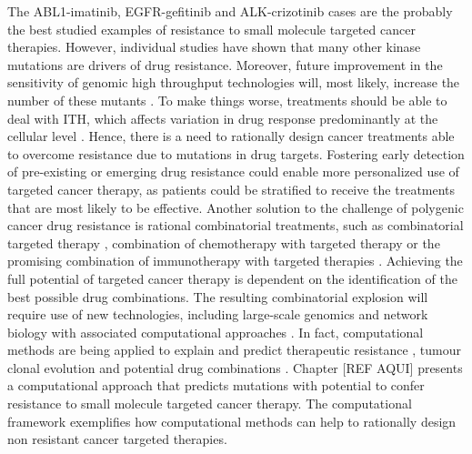 \documentclass[12pt, b5paper,twoside]{tesi_upf}
\begin{document}
\par The ABL1-imatinib, EGFR-gefitinib and ALK-crizotinib cases are the probably the best studied examples of resistance to small molecule targeted cancer therapies. However, individual studies have shown that many other kinase mutations are drivers of drug resistance. Moreover, future improvement in the sensitivity of genomic high throughput technologies will, most likely, increase the number of these mutants \cite{Schmitt2015}. To make things worse, treatments should be able to deal with ITH, which affects variation in drug response predominantly at the cellular level \cite{Burrell2014}. Hence, there is a need to rationally design cancer treatments able to overcome resistance due to mutations in drug targets. Fostering early detection of pre-existing or emerging drug resistance could enable more personalized use of targeted cancer therapy, as patients could be stratified to receive the treatments that are most likely to be effective. Another solution to the challenge of polygenic cancer drug resistance is rational combinatorial treatments, such as combinatorial targeted therapy \cite{Flaherty2012}, combination of chemotherapy with targeted therapy \cite{Cortes2016} or the promising combination of immunotherapy with targeted therapies \cite{Vanneman2012}. Achieving the full potential of targeted cancer therapy is dependent on the identification of the best possible drug combinations. The resulting combinatorial explosion will require use of new technologies, including large-scale genomics and network biology with associated computational approaches \cite{Al-Lazikani2012}. In fact, computational methods are being applied to explain and predict therapeutic resistance \cite{Bozic2013, Komarova2014}, tumour clonal evolution \cite{Williams2016, Attolini2010} and potential drug combinations \cite{Chmielecki2011, Huang2007}. Chapter [REF AQUI] presents a computational approach that predicts mutations with potential to confer resistance to small molecule targeted cancer therapy. The computational framework exemplifies how computational methods can help to rationally design non resistant cancer targeted therapies. 

 










%



\backmatter
\printindex

\printbibliography
\end{document}
